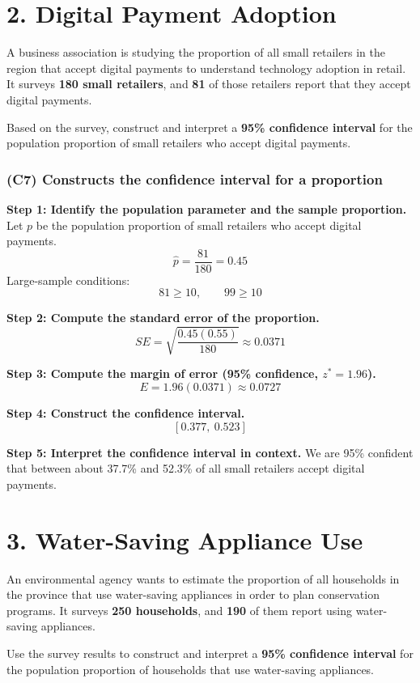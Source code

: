 \section*{2. Digital Payment Adoption}

A business association is studying the proportion of all small retailers in the region that accept digital payments to understand technology adoption in retail. It surveys \textbf{180 small retailers}, and \textbf{81} of those retailers report that they accept digital payments.

Based on the survey, construct and interpret a \textbf{95\% confidence interval} for the population proportion of small retailers who accept digital payments.
	
	\subsubsection*{(C7) Constructs the confidence interval for a proportion}
	
	\textbf{Step 1: Identify the population parameter and the sample proportion.}
	Let \(p\) be the population proportion of small retailers who accept digital payments.
	\[
	\hat{p} = \frac{81}{180} = 0.45
	\]
	Large-sample conditions:
	\[
	81 \ge 10, \qquad 99 \ge 10
	\]
	
	\textbf{Step 2: Compute the standard error of the proportion.}
	\[
	SE = \sqrt{\frac{0.45(0.55)}{180}} \approx 0.0371
	\]
	
	\textbf{Step 3: Compute the margin of error (95\% confidence, \(z^* = 1.96\)).}
	\[
	E = 1.96(0.0371) \approx 0.0727
	\]
	
	\textbf{Step 4: Construct the confidence interval.}
	\[
	[0.377,\ 0.523]
	\]
	
	\textbf{Step 5: Interpret the confidence interval in context.}
	We are 95\% confident that between about 37.7\% and 52.3\% of all small retailers accept digital payments.
	
\section*{3. Water-Saving Appliance Use}

An environmental agency wants to estimate the proportion of all households in the province that use water-saving appliances in order to plan conservation programs. It surveys \textbf{250 households}, and \textbf{190} of them report using water-saving appliances.

Use the survey results to construct and interpret a \textbf{95\% confidence interval} for the population proportion of households that use water-saving appliances.
	
